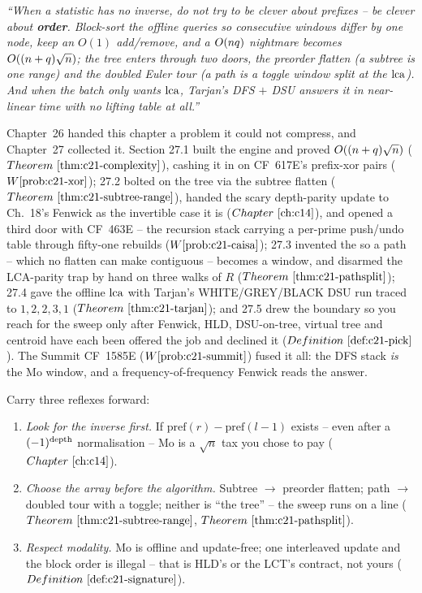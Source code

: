 \begin{lastword}
\emph{``When a statistic has no inverse, do not try to be clever about prefixes -- be
clever about \textbf{order}. Block-sort the offline queries so consecutive windows differ
by one node, keep an \(O(1)\) add/remove, and a \(O(nq)\) nightmare becomes
\(O((n+q)\sqrt n)\); the tree enters through two doors, the preorder flatten (a subtree
is one range) and the doubled Euler tour (a path is a toggle window split at the
\(\operatorname{lca}\)). And when the batch only wants \(\operatorname{lca}\), Tarjan's DFS \(+\) DSU answers it in
near-linear time with no lifting table at all.''}

\medskip
Chapter~26 handed this chapter a problem it could not compress, and Chapter~27 collected
it. Section 27.1 built the engine and proved \(O((n+q)\sqrt n)\)
(\(\thmref{c21-complexity}\)), cashing it in on CF~617E's prefix-xor pairs
(\(\probref{c21-xor}\)); 27.2 bolted on the tree via the subtree flatten
(\(\thmref{c21-subtree-range}\)), handed the scary depth-parity update to Ch.~18's
Fenwick as the invertible case it is (\(\chref{c14}\)), and opened a third door with
CF~463E -- the recursion stack carrying a per-prime push/undo table through
fifty-one rebuilds (\(\probref{c21-caisa}\)); 27.3 invented the  so a path -- which no
flatten can make contiguous -- becomes a window, and disarmed the LCA-parity trap by hand
on three walks of \(R\) (\(\thmref{c21-pathsplit}\)); 27.4 gave the offline \(\operatorname{lca}\) with
Tarjan's WHITE/GREY/BLACK DSU run traced to \(1,2,2,3,1\) (\(\thmref{c21-tarjan}\)); and
27.5 drew the boundary so you reach for the sweep only after Fenwick, HLD, DSU-on-tree,
virtual tree and centroid have each been offered the job and declined it
(\(\defref{c21-pick}\)). The Summit CF~1585E (\(\probref{c21-summit}\)) fused it all: the
DFS stack \emph{is} the Mo window, and a frequency-of-frequency Fenwick reads the answer.

\medskip
Carry three reflexes forward:
\begin{enumerate}[nosep, leftmargin=1.6em]
  \item \emph{Look for the inverse first.} If \(\mathrm{pref}(r)-\mathrm{pref}(l-1)\)
        exists -- even after a \((-1)^{\operatorname{depth}}\) normalisation -- Mo is a \(\sqrt n\) tax
        you chose to pay (\(\chref{c14}\)).
  \item \emph{Choose the array before the algorithm.} Subtree \(\to\) preorder flatten;
        path \(\to\) doubled tour with a toggle; neither is ``the tree'' -- the sweep runs
        on a line (\(\thmref{c21-subtree-range}\), \(\thmref{c21-pathsplit}\)).
  \item \emph{Respect modality.} Mo is offline and update-free; one interleaved update and
        the block order is illegal -- that is HLD's or the LCT's contract, not yours
        (\(\defref{c21-signature}\)).
\end{enumerate}


\end{lastword}
